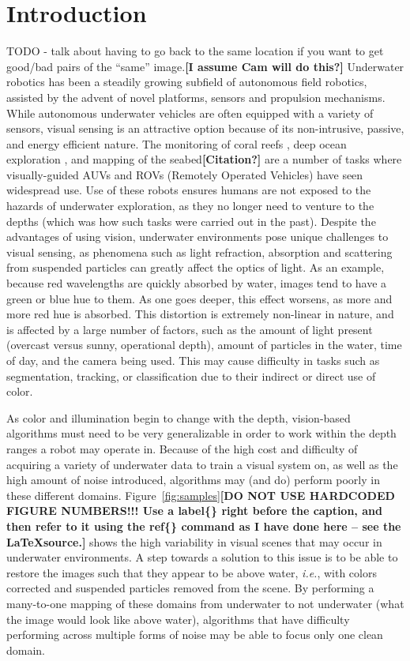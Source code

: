 \documentclass[letterpaper, 10pt, conference]{ieeeconf}
\newcommand{\marginlabel}[1]{\mbox{}\marginpar[\raggedleft\hspace{0pt}{#1}]{
\raggedright\hspace{0pt}{#1}}}
\newcommand{\starnote}[1]{\marginlabel{$\bigstar$}\textbf{[#1]}}
\begin{document}
\section{Introduction}
TODO - talk about having to go back to the same location if you want to get good/bad pairs of the ``same'' image.\starnote{I assume Cam will
do this?}  Underwater robotics has been a steadily growing subfield of autonomous field robotics, assisted by the advent of novel platforms,
sensors and propulsion mechanisms. While autonomous underwater vehicles are often equipped with a variety of sensors, visual sensing is an
attractive option because of its non-intrusive, passive, and energy efficient nature. The monitoring of coral reefs \cite{shkurti2012multi},
deep ocean exploration \cite{whitcomb2000advances}, and mapping of the seabed\starnote{Citation?} are a number of tasks where
visually-guided AUVs and ROVs (Remotely Operated Vehicles) have seen widespread use. Use of these robots ensures humans are not exposed to
the hazards of underwater exploration, as they no longer need to venture to the depths (which was how such tasks were carried out in the
past). Despite the advantages of using vision, underwater environments pose unique challenges to visual sensing, as phenomena such as light
refraction, absorption and scattering from suspended particles can greatly affect the optics of light. As an example, because red
wavelengths are quickly absorbed by water, images tend to have a green or blue hue to them. As one goes deeper, this effect worsens, as more
and more red hue is absorbed. This distortion is extremely non-linear in nature, and is affected by a large number of factors, such as the
amount of light present (overcast versus sunny, operational depth), amount of particles in the water, time of day, and the camera being
used. This may cause difficulty in tasks such as segmentation, tracking, or classification due to their indirect or direct use of color.

As color and illumination begin to change with the depth, vision-based algorithms must need to be very generalizable in order to work within
the depth ranges a robot may operate in. Because of the high cost and difficulty of acquiring a variety of underwater data to train a visual
system on, as well as the high amount of noise introduced, algorithms may (and do) perform poorly in these different
domains. Figure~\ref{fig:samples}\starnote{DO NOT USE HARDCODED FIGURE NUMBERS!!! Use a label\{\} right before the caption, and then refer
to it using the ref\{\} command as I have done here -- see the \LaTeX source.} shows the high variability in visual scenes that may occur in
underwater environments. A step towards a solution to this issue is to be able to restore the images such that they appear to be above
water, \emph{i.e.}, with colors corrected and suspended particles removed from the scene. By performing a many-to-one mapping of these
domains from underwater to not underwater (what the image would look like above water), algorithms that have difficulty performing across
multiple forms of noise may be able to focus only one clean domain.
\end{document}
